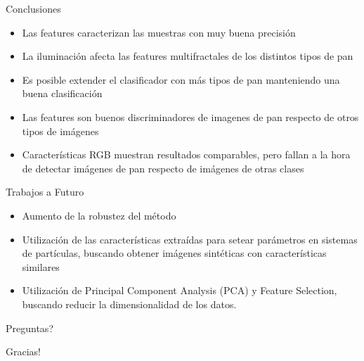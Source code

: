 \documentclass{beamer}
\begin{document}
\begin{frame}{Conclusiones}

\begin{itemize}
\item Las features caracterizan las muestras con muy buena precisi\'on
\item La iluminaci\'on afecta las features multifractales de los distintos tipos de pan
\item Es posible extender el clasificador con m\'as tipos de pan manteniendo una buena clasificaci\'on
\item Las features son buenos discriminadores de imagenes de pan respecto de otros tipos de im\'agenes
\item Caracter\'isticas RGB muestran resultados comparables, pero fallan a la hora de detectar im\'agenes de pan respecto de im\'agenes de otras clases
\end{itemize}

\end{frame}

\begin{frame}{Trabajos a Futuro}

\begin{itemize}
\item Aumento de la robustez del m\'etodo
\item Utilizaci\'on de las caracter\'isticas extra\'idas para setear par\'ametros en sistemas de part\'iculas, buscando obtener im\'agenes sint\'eticas con caracter\'isticas similares
\item Utilizaci\'on de Principal Component Analysis (PCA) y Feature Selection, buscando reducir la dimensionalidad de los datos.
\end{itemize}

\end{frame}

\begin{frame}
\begin{center}
{\huge Preguntas?}
\end{center}
\end{frame}

\begin{frame}
\begin{center}
{\huge Gracias!}
\end{center}
\end{frame}
\end{document}
